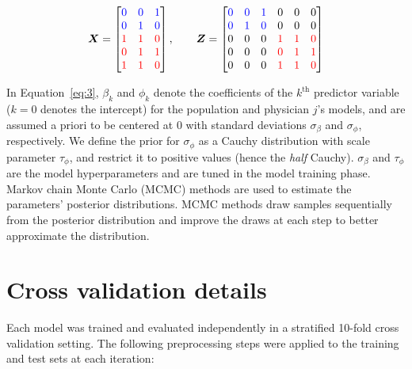 \begin{equation*}
   \boldsymbol{X} =	\begin{bmatrix}
\color{blue} 0 & \color{blue} 0 & \color{blue} 1\\
\color{blue} 0 & \color{blue} 1 & \color{blue} 0\\
\color{red} 1 & \color{red} 1 & \color{red} 0\\
\color{red} 0 & \color{red} 1 & \color{red} 1\\

\color{red} 1 & \color{red} 1 & \color{red} 0 \end{bmatrix} , \qquad \boldsymbol{Z} =	\begin{bmatrix}
\color{blue} 0 & \color{blue} 0 & \color{blue} 1 & 0 & 0 & 0\\
\color{blue} 0 & \color{blue} 1 & \color{blue} 0 & 0 & 0 & 0\\
0 & 0 & 0 & \color{red} 1 & \color{red} 1 & \color{red} 0\\
0 & 0 & 0 & \color{red} 0 & \color{red} 1 & \color{red} 1\\
0 & 0 & 0 & \color{red} 1 & \color{red} 1 & \color{red} 0 
\end{bmatrix}
\end{equation*}

In Equation~\ref{eq:3}, $\beta_k$ and $\phi_k$ denote the coefficients of the $k^{\text{th}}$ predictor variable ($k=0$ denotes the intercept) for the population and physician $j$’s models, and are assumed a priori to be centered at 0 with standard deviations $\sigma_{\beta}$ and $\sigma_{\phi}$, respectively. We define the prior for $\sigma_{\phi}$ as a Cauchy distribution with scale parameter $\tau_{\phi}$, and restrict it to positive values (hence the \textit{half} Cauchy). $\sigma_{\beta}$ and $\tau_{\phi}$ are the model hyperparameters and are tuned in the model training phase. Markov chain Monte Carlo (MCMC) methods are used to estimate the parameters’ posterior distributions. MCMC methods draw samples sequentially from the posterior distribution and improve the draws at each step to better approximate the distribution.

\section{Cross validation details}\label{sec:app_B}
Each model was trained and evaluated independently in a stratified 10-fold cross validation setting. The following preprocessing steps were applied to the training and test sets at each iteration:

